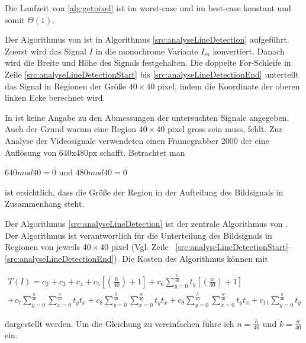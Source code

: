 

Die Laufzeit von \autoref{alg:getpixel} ist im worst-case und im best-case konstant und somit $\Theta(1)$.

Der Algorithmus von \citeauthor{clarke96} ist in Algorithmus \ref{src:analyseLineDetection} aufgeführt. Zuerst wird das
 Signal $I$ in die monochrome Variante $I_m$ konvertiert. Danach wird die Breite und Höhe des Signals festgehalten. Die
 doppelte For-Schleife in Zeile \ref{src:analyseLineDetectionStart} bis \ref{src:analyseLineDetectionEnd} unterteilt
 das Signal in Regionen der Größe $40 \times 40$ \gls{pixel}, indem die Koordinate der oberen linken Ecke berechnet
 wird.



In \citeauthor{clarke96} ist keine Angabe zu den Abmessungen der untersuchten Signale angegeben. Auch der Grund warum
 eine Region $40 \times 40$ \gls{pixel} gross sein muss, fehlt. Zur Analyse der Videosignale verwendeten
 \citeauthor{clarke96} einen Framegrabber 2000 der eine Auflösung von 640x480px schafft. Betrachtet man

$640 mod 40 = 0$ und $480 mod 40 = 0$

ist ersichtlich, dass die Größe der Region in der Aufteilung des Bildsignals in Zusammenhang steht.

Der Algorithmus \ref{src:analyseLineDetection} ist der zentrale Algorithmus von \citeauthor{clarke96}. Der Algorithmus
 ist verantwortlich für die Unterteilung des Bildsignals in Regionen von jeweils $40 \times 40$ \gls{pixel} (Vgl. Zeile
~\ref{src:analyseLineDetectionStart}--\ref{src:analyseLineDetectionEnd}). Die Kosten des Algorithmus können mit

\begin{equation}
\begin{split}
	T(I) = c_2
	 + c_3
	 + c_4
	 + c_5 \left[\left(\frac{h}{40}\right) + 1\right]
	 + c_6 \sum \limits_{y = 0}^{\frac{h}{40}} t_y \left[\left(\frac{w}{40}\right) + 1 \right]\\
	 + c_7 \sum \limits_{y = 0}^{\frac{h}{40}} \sum \limits_{x = 0}^{\frac{w}{40}} t_y t_x
	 + c_8 \sum \limits_{y = 0}^{\frac{h}{40}} \sum \limits_{x = 0}^{\frac{w}{40}} t_y t_x
	 + c_9 \sum \limits_{y = 0}^{\frac{h}{40}} \sum \limits_{x = 0}^{\frac{w}{40}} t_y t_x
	 + c_{11} \sum \limits_{y = 0}^{\frac{h}{40}} t_y
\end{split}
\end{equation}

dargestellt werden. Um die Gleichung zu vereinfachen führe ich $n = \tfrac{h}{40}$ und $k = \tfrac{w}{40}$ ein.

